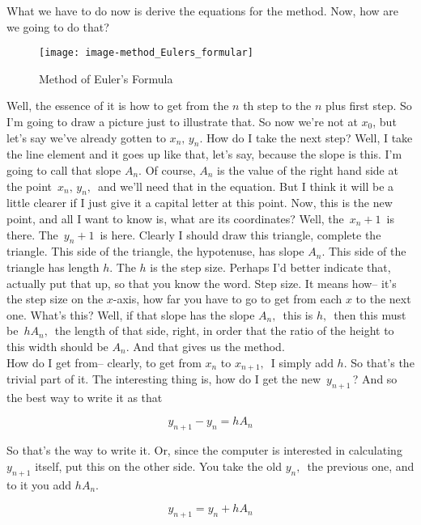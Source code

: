 What we have to do now is derive the equations for the method.
Now, how are we going to do that?

\begin{wrapfigure}{r}{5.5cm}
  \texttt{[image: image-method\_Eulers\_formular]}
  \caption{Method of Euler's Formula}
\end{wrapfigure}

Well, the essence of it is how to get from the $n$ th step to the $n$ plus first step.
So I'm going to draw a picture just to illustrate that.
So now we're not at $x_0$, but let's say we've already gotten to $x_n, \, y_n$.
How do I take the next step?
Well, I take the line element and it goes up like that,
let's say, because the slope is this.
I'm going to call that slope $A_n$.
Of course, $A_n$ is the value of the right hand side
at the point $\, x_n,\, y_n, \,$ and we'll need that in the equation.
But I think it will be a little clearer if I just give it a capital letter at this point.
Now, this is the new point, and all I want to know is, what are its coordinates?
Well, the $\, x_n + 1 \, $ is there. The $\, y_n + 1 \,$ is here.
Clearly I should draw this triangle, complete the triangle.
This side of the triangle, the hypotenuse, has slope $A_n$.
This side of the triangle has length $h$. The $h$ is the step size.
Perhaps I'd better indicate that, actually put that up,
so that you know the word. Step size.
It means how-- it's the step size on the $x$-axis, how far you have to go to get
from each $x$ to the next one.
What's this? Well, if that slope has the slope $A_n, \,$ this is $h, \,$
then this must be $\, h A_n, \,$ the length of that side,
right, in order that the ratio of the height to this width should be $A_n$.
And that gives us the method. \\
How do I get from--
clearly, to get from $x_n$ to $x _{n+1}, \,$ I simply add $h$.
So that's the trivial part of it.
The interesting thing is, how do I get the new $\, y_{n+1}\,$?
And so the best way to write it as that

\begin{equation*}
  y _{n+1} - y_n = h A_n 
\end{equation*}

So that's the way to write it.
Or, since the computer is interested in calculating
$y_{n+1}$ itself, put this on the other side.
You take the old $y_n, \,$ the previous one, and to it you add $h A_n $.

\begin{equation*}
  y_{n+1} = y_n + h A_n
\end{equation*}

